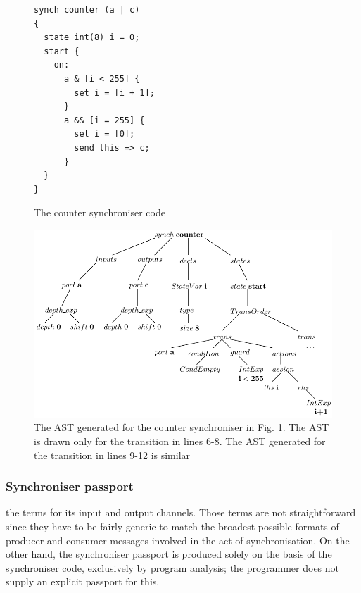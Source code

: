\begin{figure}[h!]
\lstset{numbers=left, numberstyle=\small, stepnumber=1, numbersep=8pt}
\begin{lstlisting}[frame=single]
synch counter (a | c)
{
  state int(8) i = 0;
  start {
    on:
      a & [i < 255] {
        set i = [i + 1];
      }
      a && [i = 255] {
        set i = [0];
        send this => c;
      }
  }
}
\end{lstlisting}
\caption{The counter synchroniser code}
\label{sync_ast}
\end{figure}

\begin{figure}[here]
\centering
\includegraphics[scale=0.8]{figs/chapter_02_runtime_struc.pdf}
\caption{The AST generated for the counter synchroniser in Fig. \ref{sync_ast}. The AST is drawn only for the transition in lines 6-8. The AST generated for the transition in lines 9-12 is similar}
\label{fig:runtime_struc}
\end{figure}


  \subsubsection*{Synchroniser passport}
 the  terms for its input and output channels. Those terms are not straightforward since they have to be fairly generic to match the broadest possible formats of producer and consumer messages involved in the act of synchronisation. On the other hand, the synchroniser passport is produced solely on the basis of the synchroniser code, exclusively by program analysis; the programmer does not supply an explicit passport for this.

